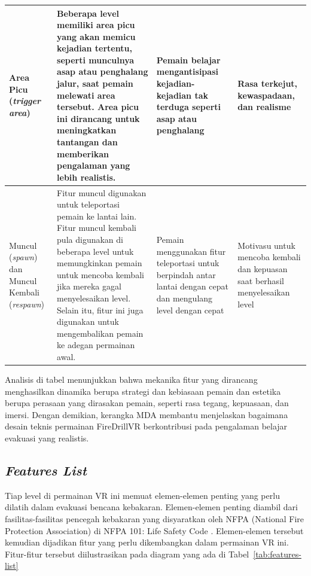 \begin{table}[h!]
\centering
\begin{tabular}{|p{3cm}|p{5cm}|p{3cm}|p{3cm}|}
\hline

Area Picu (\textit{trigger area}) & Beberapa level memiliki area picu yang akan memicu kejadian tertentu, seperti munculnya asap atau penghalang jalur, saat pemain melewati area tersebut. Area picu ini dirancang untuk meningkatkan tantangan dan memberikan pengalaman yang lebih realistis. & Pemain belajar mengantisipasi kejadian-kejadian tak terduga seperti asap atau penghalang & Rasa terkejut, kewaspadaan, dan realisme  \\ \hline
Muncul (\textit{spawn}) dan Muncul Kembali (\textit{respawn}) & Fitur muncul digunakan untuk teleportasi pemain ke lantai lain. Fitur muncul kembali pula digunakan di beberapa level untuk memungkinkan pemain untuk mencoba kembali jika mereka gagal menyelesaikan level. Selain itu, fitur ini juga digunakan untuk mengembalikan pemain ke adegan permainan awal. & Pemain menggunakan fitur teleportasi untuk berpindah antar lantai dengan cepat dan mengulang level dengan cepat & Motivasu untuk mencoba kembali dan kepuasan saat berhasil menyelesaikan level \\ \hline
\end{tabular}


\end{table}





Analisis di tabel menunjukkan bahwa mekanika fitur yang dirancang menghasilkan dinamika berupa strategi dan kebiasaan pemain dan estetika berupa perasaan yang dirasakan pemain, seperti rasa tegang, kepuasaan, dan imersi. Dengan demikian, kerangka MDA membantu menjelaskan bagaimana desain teknis permainan FireDrillVR berkontribusi pada pengalaman belajar evakuasi yang realistis.


\subsection{\textit{Features List}}
Tiap level di permainan VR ini memuat elemen-elemen penting yang perlu dilatih dalam evakuasi bencana kebakaran. Elemen-elemen penting diambil dari fasilitas-fasilitas pencegah kebakaran yang disyaratkan oleh NFPA (National Fire Protection Association) di NFPA 101: Life Safety Code \cite{NFPA}. Elemen-elemen tersebut kemudian dijadikan fitur yang perlu dikembangkan dalam permainan VR ini. Fitur-fitur tersebut diilustrasikan pada diagram yang ada di Tabel~\ref{tab:features-list}

